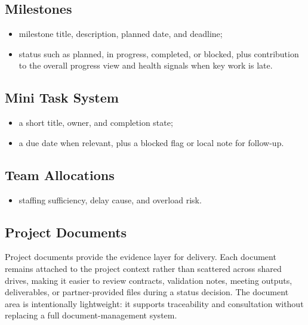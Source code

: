 \subsection{Milestones}
\begin{itemize}
  \item milestone title, description, planned date, and deadline;
  \item status such as planned, in progress, completed, or blocked, plus contribution to the overall progress view and health signals when key work is late.
\end{itemize}
\subsection{Mini Task System}
\begin{itemize}
  \item a short title, owner, and completion state;
  \item a due date when relevant, plus a blocked flag or local note for follow-up.
\end{itemize}
\subsection{Team Allocations}
\begin{itemize}
  \item staffing sufficiency, delay cause, and overload risk.
\end{itemize}
\subsection{Project Documents}
Project documents provide the evidence layer for delivery. Each document remains attached to the project context rather than scattered across shared drives, making it easier to review contracts, validation notes, meeting outputs, deliverables, or partner-provided files during a status decision. The document area is intentionally lightweight: it supports traceability and consultation without replacing a full document-management system.

